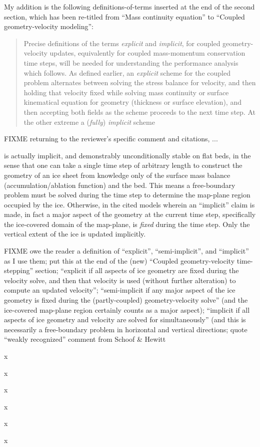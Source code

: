 \documentclass[letterpaper,final,12pt,reqno]{amsart}
\newenvironment{review}%
{\bigskip \par \begin{quote} \selectfont \sl}%
{\end{quote}}
\begin{document}
My addition is the following definitions-of-terms inserted at the end of the second section, which has been re-titled from ``Mass continuity equation'' to ``Coupled geometry-velocity modeling'':

\begin{quote}
Precise definitions of the terms \emph{explicit} and \emph{implicit}, for coupled geometry-velocity updates, equivalently for coupled mass-momentum conservation time steps, will be needed for understanding the performance analysis which follows.  As defined earlier, an \emph{explicit} scheme for the coupled problem alternates between solving the stress balance for velocity, and then holding that velocity fixed while solving mass continuity or surface kinematical equation for geometry (thickness or surface elevation), and then accepting both fields as the scheme proceeds to the next time step.  At the other extreme a (\emph{fully}) \emph{implicit} scheme 
\end{quote}

FIXME returning to the reviewer's specific comment and citations, ...

 is actually implicit, and demonstrably unconditionally stable on flat beds, in the sense that one can take a single time step of arbitrary length to construct the geometry of an ice sheet from knowledge only of the surface mass balance (accumulation/ablation function) and the bed.  This means a free-boundary problem must be solved during the time step to determine the map-plane region occupied by the ice.  Otherwise, in the cited models wherein an ``implicit'' claim is made, in fact a major aspect of the geometry at the current time step, specifically the ice-covered domain of the map-plane, is \emph{fixed} during the time step.  Only the vertical extent of the ice is updated implicitly.

FIXME owe the reader a definition of ``explicit'', ``semi-implicit'', and ``implicit'' as I use them; put this at the end of the (new) ``Coupled geometry-velocity time-stepping'' section; ``explicit if all aspects of ice geometry are fixed during the velocity solve, and then that velocity is used (without further alteration) to compute an updated velocity''; ``semi-implicit if any major aspect of the ice geometry is fixed during the (partly-coupled) geometry-velocity solve'' (and the ice-covered map-plane region certainly counts as a major aspect); ``implicit if all aspects of ice geometry and velocity are solved for simultaneously'' (and this is necessarily a free-boundary problem in horizontal and vertical directions; quote ``weakly recognized'' comment from Schoof \& Hewitt

\begin{review}
\end{review}

\noindent x
\begin{review}
\end{review}

\noindent x
\begin{review}
\end{review}

\noindent x
\begin{review}
\end{review}

\noindent x
\begin{review}
\end{review}

\noindent x
\begin{review}
\end{review}

\noindent x
\end{document}
